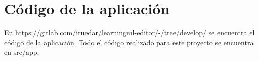 \documentclass[a4paper, 12pt]{book}
\begin{document}

\cleardoublepage
\appendix
\chapter{Código de la aplicación}
\label{app:codigo}

En \url{https://gitlab.com/iruedar/learningml-editor/-/tree/develop/} se encuentra el código de la aplicación. Todo el código realizado para este proyecto se encuentra en src/app.


\cleardoublepage


\end{document}
